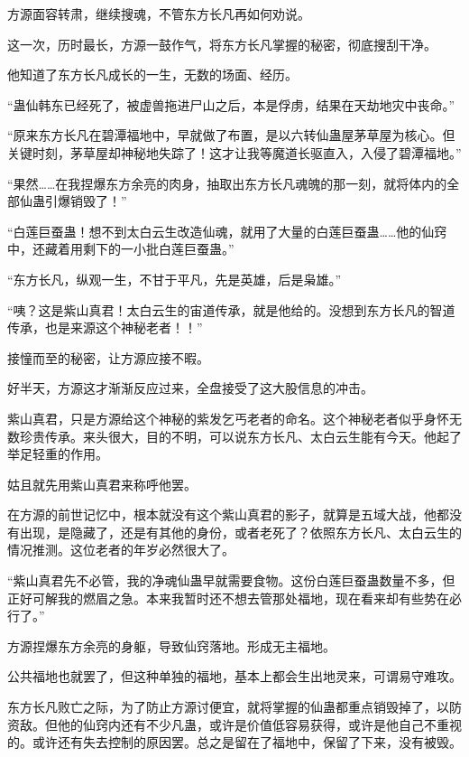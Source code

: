 
\begin{this_body}



方源面容转肃，继续搜魂，不管东方长凡再如何劝说。

这一次，历时最长，方源一鼓作气，将东方长凡掌握的秘密，彻底搜刮干净。

他知道了东方长凡成长的一生，无数的场面、经历。

“蛊仙韩东已经死了，被虚兽拖进尸山之后，本是俘虏，结果在天劫地灾中丧命。”

“原来东方长凡在碧潭福地中，早就做了布置，是以六转仙蛊屋茅草屋为核心。但关键时刻，茅草屋却神秘地失踪了！这才让我等魔道长驱直入，入侵了碧潭福地。”

“果然……在我捏爆东方余亮的肉身，抽取出东方长凡魂魄的那一刻，就将体内的全部仙蛊引爆销毁了！”

“白莲巨蚕蛊！想不到太白云生改造仙魂，就用了大量的白莲巨蚕蛊……他的仙窍中，还藏着用剩下的一小批白莲巨蚕蛊。”

“东方长凡，纵观一生，不甘于平凡，先是英雄，后是枭雄。”

“咦？这是紫山真君！太白云生的宙道传承，就是他给的。没想到东方长凡的智道传承，也是来源这个神秘老者！！”

接憧而至的秘密，让方源应接不暇。

好半天，方源这才渐渐反应过来，全盘接受了这大股信息的冲击。

紫山真君，只是方源给这个神秘的紫发乞丐老者的命名。这个神秘老者似乎身怀无数珍贵传承。来头很大，目的不明，可以说东方长凡、太白云生能有今天。他起了举足轻重的作用。

姑且就先用紫山真君来称呼他罢。

在方源的前世记忆中，根本就没有这个紫山真君的影子，就算是五域大战，他都没有出现，是隐藏了，还是有其他的身份，或者老死了？依照东方长凡、太白云生的情况推测。这位老者的年岁必然很大了。

“紫山真君先不必管，我的净魂仙蛊早就需要食物。这份白莲巨蚕蛊数量不多，但正好可解我的燃眉之急。本来我暂时还不想去管那处福地，现在看来却有些势在必行了。”

方源捏爆东方余亮的身躯，导致仙窍落地。形成无主福地。

公共福地也就罢了，但这种单独的福地，基本上都会生出地灵来，可谓易守难攻。

东方长凡败亡之际，为了防止方源讨便宜，就将掌握的仙蛊都重点销毁掉了，以防资敌。但他的仙窍内还有不少凡蛊，或许是价值低容易获得，或许是他自己不重视的。或许还有失去控制的原因罢。总之是留在了福地中，保留了下来，没有被毁。


\end{this_body}
